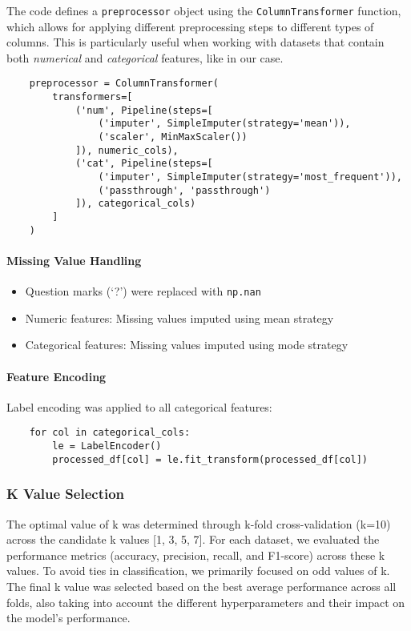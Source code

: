 The code defines a \texttt{preprocessor} object using the \texttt{ColumnTransformer} function,
which allows for applying different preprocessing steps to different types of columns.
This is particularly useful when working with datasets that contain both \textit{numerical} and \textit{categorical} features, like in our case.
\begin{verbatim}
    preprocessor = ColumnTransformer(
        transformers=[
            ('num', Pipeline(steps=[
                ('imputer', SimpleImputer(strategy='mean')),
                ('scaler', MinMaxScaler())
            ]), numeric_cols),
            ('cat', Pipeline(steps=[
                ('imputer', SimpleImputer(strategy='most_frequent')),
                ('passthrough', 'passthrough')
            ]), categorical_cols)
        ]
    )
\end{verbatim}

\paragraph{Missing Value Handling}
    \begin{itemize}
    \item Question marks (`?') were replaced with \texttt{np.nan}
    \item Numeric features: Missing values imputed using mean strategy
    \item Categorical features: Missing values imputed using mode strategy
    \end{itemize}

\paragraph{Feature Encoding}
Label encoding was applied to all categorical features:
\begin{verbatim}
    for col in categorical_cols:
        le = LabelEncoder()
        processed_df[col] = le.fit_transform(processed_df[col])
\end{verbatim}

\subsubsection*{K Value Selection}
The optimal value of k was determined through k-fold cross-validation (k=10) across the candidate k values [1, 3, 5, 7].
For each dataset, we evaluated the performance metrics (accuracy, precision, recall, and F1-score) across these k values.
To avoid ties in classification, we primarily focused on odd values of k.
The final k value was selected based on the best average performance across all folds, also taking into account
the different hyperparameters and their impact on the model's performance.

